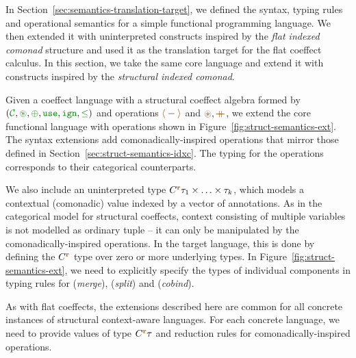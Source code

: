 In Section~\ref{sec:semantics-translation-target}, we defined the syntax, typing rules and
operational semantics for a simple functional programming language. We then extended it with
uninterpreted constructs inspired by the \emph{flat indexed comonad} structure and used it as the
translation target for the flat coeffect calculus. In this section, we take the same core language
and extend it with constructs inspired by the \emph{structural indexed comonad}.

Given a coeffect language with a structural coeffect algebra formed by
$(\C, \cseq, \cpar, \cunit, \czero, \cleq)$ and operations $\alift{-}$ and $\aseq, \atimes$, we
extend the core functional language with operations shown in Figure~\ref{fig:struct-semantics-ext}.
The syntax extensions add comonadically-inspired operations that mirror those defined in
Section~\ref{sec:struct-semantics-idxc}. The typing for the operations corresponds to their
categorical counterparts.

We also include an uninterpreted type $\ctyp{\aclrd{\textbf{r}}}{\tau_1\times\ldots\times\tau_k}$,
which models a contextual (comonadic) value indexed by a vector of annotations. As in the
categorical model for structural coeffects, context consisting of multiple variables is not modelled
as ordinary tuple -- it can only be manipulated by the comonadically-inspired operations.
In the target language, this is done by defining the $\ctyp{\aclrd{\textbf{r}}}{}$ type over
zero or more underlying types. In Figure~\ref{fig:struct-semantics-ext},
we need to explicitly specify the types of individual components in typing rules for
(\emph{merge}), (\emph{split}) and (\emph{cobind}).

As with flat coeffects, the extensions described here are common for all concrete instances of
structural context-aware languages. For each concrete language, we need to provide values of type
$\ctyp{\aclrd{\textbf{r}}}{\tau}$ and reduction rules for comonadically-inspired operations.


